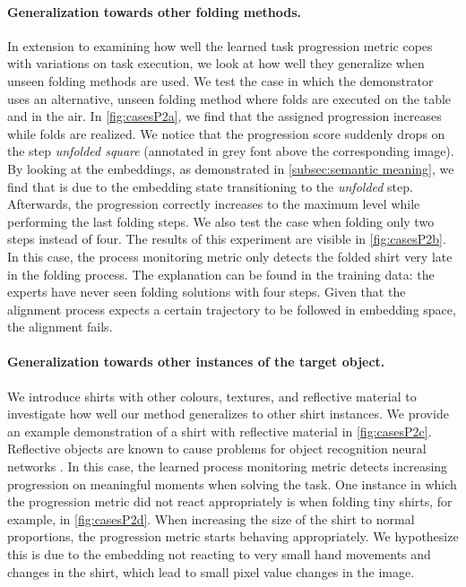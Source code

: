 \documentclass[\home/main.tex]{subfiles}
\begin{document}
\paragraph{Generalization towards other folding methods.}
In extension to examining how well the learned task progression metric copes with variations on task execution, we look at how well they generalize when unseen folding methods are used. We test the case in which the demonstrator uses an alternative, unseen folding method where folds are executed on the table and in the air. In \cref{fig:casesP2a}, we find that the assigned progression increases while folds are realized. We notice that the progression score suddenly drops on the step \textit{unfolded square} (annotated in grey font above the corresponding image). By looking at the embeddings, as demonstrated in \cref{subsec:semantic meaning}, we find that is due to the embedding state transitioning to the \textit{unfolded} step. Afterwards, the progression correctly increases to the maximum level while performing the last folding steps.
We also test the case when folding only two steps instead of four. The results of this experiment are visible in \cref{fig:casesP2b}. In this case, the process monitoring metric only detects the folded shirt very late in the folding process. The explanation can be found in the training data: the experts have never seen folding solutions with four steps. Given that the alignment process expects a certain trajectory to be followed in embedding space, the alignment fails.

\paragraph{Generalization towards other instances of the target object.}
We introduce shirts with other colours, textures, and reflective material to investigate how well our method generalizes to other shirt instances. We provide an example demonstration of a shirt with reflective material in \cref{fig:casesP2c}. Reflective objects are known to cause problems for object recognition neural networks \autocite{sajjan2019cleargrasp}. In this case, the learned process monitoring metric detects increasing progression on meaningful moments when solving the task. One instance in which the progression metric did not react appropriately is when folding tiny shirts, for example, in \cref{fig:casesP2d}. When increasing the size of the shirt to normal proportions, the progression metric starts behaving appropriately. We hypothesize this is due to the embedding not reacting to very small hand movements and changes in the shirt, which lead to small pixel value changes in the image.
\end{document}
